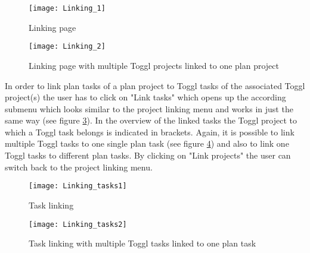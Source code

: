 \begin{figure}[H]
	\centering
	\texttt{[image: Linking\_1]}
	\caption{Linking page}
	\label{Linking init}
\end{figure}

\begin{figure}[H]
	\centering
	\texttt{[image: Linking\_2]}
	\caption{Linking page with multiple Toggl projects linked to one plan project}
	\label{Linking multiple}
\end{figure}

In order to link plan tasks of a plan project to Toggl tasks of the associated Toggl project(s) the user has to click on "Link tasks" which opens up the according submenu which looks similar to the project linking menu and works in just the same way (see figure \ref{Linking tasks init}). In the overview of the linked tasks the Toggl project to which a Toggl task belongs is indicated in brackets. Again, it is possible to link multiple Toggl tasks to one single plan task (see figure \ref{Linking tasks multiple}) and also to link one Toggl tasks to different plan tasks. By clicking on "Link projects" the user can switch back to the project linking menu.

\begin{figure}[H]
	\centering
	\texttt{[image: Linking\_tasks1]}
	\caption{Task linking}
	\label{Linking tasks init}
\end{figure}

\begin{figure}[H]
	\centering
	\texttt{[image: Linking\_tasks2]}
	\caption{Task linking with multiple Toggl tasks linked to one plan task}
	\label{Linking tasks multiple}
\end{figure}